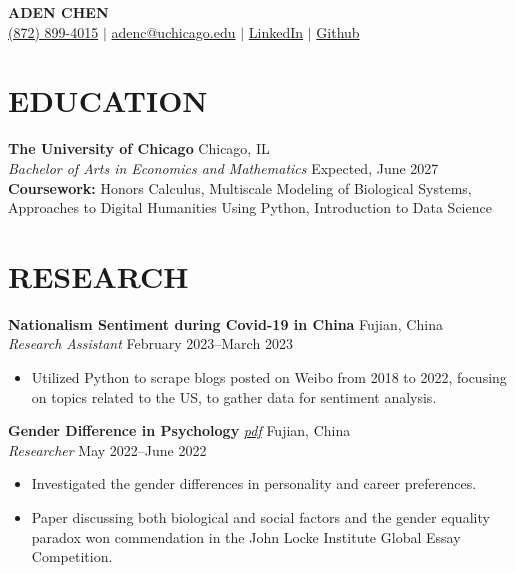 \documentclass[letterpaper, 9pt]{extarticle}
\begin{document}
\pagestyle{empty}

\begin{center}
    \textbf{\Large ADEN CHEN} \\
    \href{tel:(872) 899-4015}{\faMobile\space (872) 899-4015}
    $|$
    \href{mailto:adenc@uchicago.edu}{\faAt\space adenc@uchicago.edu}
    $|$
    \href{https://www.linkedin.com/in/aden-chen-45a924221/}{\faLinkedinSquare \space LinkedIn}
    $|$
    \href{https://github.com/AdenChen27}{\faGithub\space Github}
\end{center}

\section*{EDUCATION}
\noindent
\textbf{The University of Chicago} \hfill Chicago, IL \\ 
\textit{Bachelor of Arts in Economics and Mathematics} \hfill Expected, June 2027 \\ 
\noindent
\textbf{Coursework:} Honors Calculus, Multiscale Modeling of Biological Systems, Approaches to Digital Humanities Using Python, Introduction to Data Science

\section*{RESEARCH}
\noindent
\textbf{Nationalism Sentiment during Covid-19 in China} \hfill Fujian, China \\
\textit{Research Assistant} \hfill February 2023--March 2023
\begin{itemize}
    \item Utilized Python to scrape blogs posted on Weibo from 2018 to 2022, focusing on topics related to the US, to gather data for sentiment analysis.
\end{itemize}

\noindent
\textbf{Gender Difference in Psychology}
\emph{\href{https://drive.google.com/file/d/19cO9fOI9KPIAT2OV0WPENLVXvrM-A7fZ/view?usp=sharing}{\color{blue} pdf}}
\hfill Fujian, China \\
\textit{Researcher} \hfill May 2022--June 2022
\begin{itemize}
    \item Investigated the gender differences in personality and career preferences. 
    \item Paper discussing both biological and social factors and the gender equality paradox won commendation in the John Locke Institute Global Essay Competition.
\end{itemize}
\end{document}
